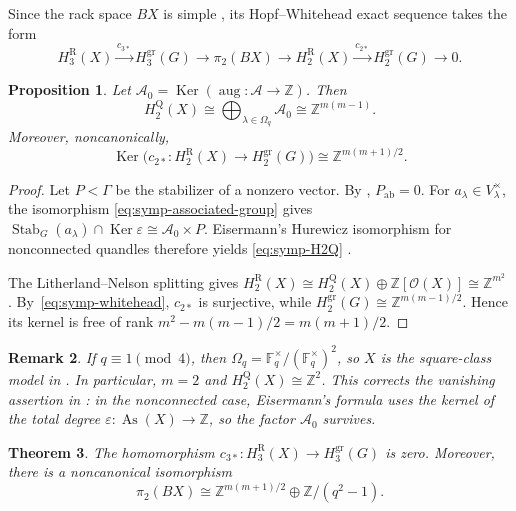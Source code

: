 \documentclass[10pt,a4paper]{amsart}
\newtheorem{theorem}{Theorem}[section]
\newtheorem{proposition}[theorem]{Proposition}
\newtheorem{remark}[theorem]{Remark}
\DeclareMathOperator{\As}{As}
\DeclareMathOperator{\Stab}{Stab}
\DeclareMathOperator{\Ker}{Ker}
\newcommand{\ZZ}{\mathbb Z}
\newcommand{\OO}{\mathcal O}
\newcommand{\gr}{\mathrm{gr}}
\newcommand{\R}{\mathrm R}
\newcommand{\Q}{\mathrm Q}
\newcommand{\ab}{\mathrm{ab}}
\begin{document}
Since the rack space $BX$ is simple
\cite[Proposition~5.2]{FRS}, its Hopf--Whitehead exact sequence takes the form
\cite[\S6.1]{NosakaHomotopical}
\begin{equation}
 H_3^\R(X)\xrightarrow{c_{3*}}H_3^{\gr}(G)
 \longrightarrow\pi_2(BX)
 \longrightarrow H_2^\R(X)\xrightarrow{c_{2*}}H_2^{\gr}(G)
 \longrightarrow0.
\label{eq:symp-whitehead}
\end{equation}

\begin{proposition}
\label{prop:symp-H2-kernels}
Let $\mathcal A_0=\Ker(\operatorname{aug}\colon\mathcal A\to\ZZ)$. Then
\begin{equation}
 H_2^\Q(X)
 \cong\bigoplus_{\lambda\in\Omega_q}\mathcal A_0
 \cong\ZZ^{m(m-1)}.
\label{eq:symp-H2Q}
\end{equation}
Moreover, noncanonically,
\[
 \Ker\bigl(c_{2*}\colon H_2^\R(X)\longrightarrow H_2^{\gr}(G)\bigr)
 \cong\ZZ^{m(m+1)/2}.
\]
\end{proposition}

\begin{proof}
Let $P<\Gamma$ be the stabilizer of a nonzero vector. By
\cite[Lemma~4.8]{NosakaAdjoint}, $P_{\ab}=0$. For
$a_\lambda\in V_\lambda^\times$, the isomorphism
\eqref{eq:symp-associated-group} gives
$\Stab_G(a_\lambda)\cap\Ker\varepsilon\cong\mathcal A_0\times P$.
Eisermann's Hurewicz isomorphism for nonconnected quandles therefore yields
\eqref{eq:symp-H2Q}
\cite[Definition~7.13 and Theorem~9.9]{Eisermann}.

The Litherland--Nelson splitting gives
$H_2^\R(X)\cong H_2^\Q(X)\oplus\ZZ[\OO(X)]\cong\ZZ^{m^2}$
\cite[Theorem~2.2]{LitherlandNelson}. By~\eqref{eq:symp-whitehead}, $c_{2*}$
is surjective, while
$H_2^{\gr}(G)\cong\ZZ^{m(m-1)/2}$. Hence its kernel is free of rank
$m^2-m(m-1)/2=m(m+1)/2$.
\end{proof}

\begin{remark}
\label{rem:comparison-nosaka-H2}
If $q\equiv1\pmod4$, then
$\Omega_q=\mathbb F_q^\times/(\mathbb F_q^\times)^2$, so $X$ is the
square-class model in \cite[\S4.2]{NosakaAdjoint}. In particular, $m=2$ and
$H_2^\Q(X)\cong\ZZ^2$. This corrects the vanishing assertion in
\cite[Proposition~4.7]{NosakaAdjoint}: in the nonconnected case,
Eisermann's formula uses the kernel of the total degree
$\varepsilon\colon\As(X)\to\ZZ$, so the factor $\mathcal A_0$ survives.
\end{remark}

\begin{theorem}
\label{thm:symp-pi2}
The homomorphism
$c_{3*}\colon H_3^\R(X)\to H_3^{\gr}(G)$ is zero. Moreover, there is a
noncanonical isomorphism
\[
 \pi_2(BX)\cong
 \ZZ^{m(m+1)/2}\oplus\ZZ/(q^2-1).
\]
\end{theorem}
\end{document}
